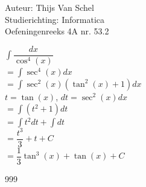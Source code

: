 \documentclass[a4paper]{article}
\newcommand{\dint}{\displaystyle\int}
\begin{document}
  
\noindent \large Auteur: Thijs Van Schel \\
\noindent \large Studierichting: Informatica\\
\noindent \large Oefeningenreeks 4A nr. 53.2\\

\medskip

\normalsize

$\dint \dfrac{dx}{\cos^4(x)}$\\

$ = \dint \sec^4(x)dx$\\

$ = \dint \sec^2(x)(\tan^2(x)+1)dx$\\

$ t = \tan(x)$, $ dt = \sec^2(x)dx$\\

$ = \dint (t^2+1)dt$\\

$ = \dint t^2dt + \dint dt$\\

$ = \dfrac{t^3}{3} + t + C$\\

$ = \dfrac{1}{3}\tan^3(x) + \tan(x) + C$\\

\begin{thebibliography}{999}
\end{thebibliography}
\end{document}
